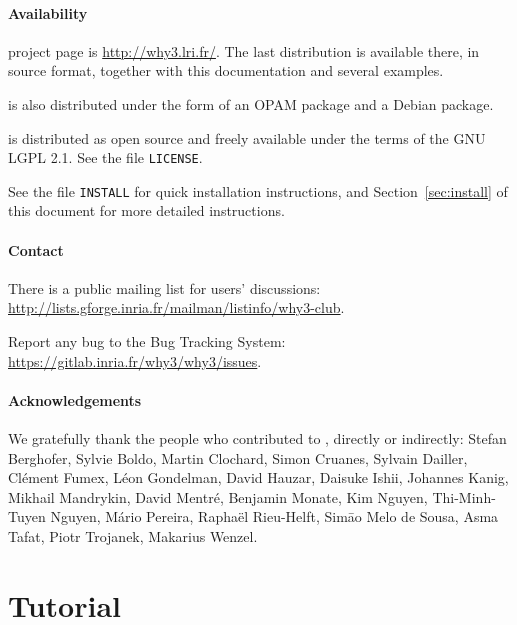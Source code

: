 \documentclass[a4paper,11pt,twoside,openright]{memoir}
\begin{document}
\subsection*{Availability}

\why project page is \url{http://why3.lri.fr/}.  The last distribution
is available there, in source format, together with this documentation
and several examples.

\why is also distributed under the form of an OPAM package and a
Debian package.

\why is distributed as open source and freely available under the
terms of the GNU LGPL 2.1. See the file \texttt{LICENSE}.

See the file \texttt{INSTALL} for quick installation instructions, and
Section~\ref{sec:install} of this document for more detailed
instructions.

\subsection*{Contact}

There is a public mailing list for users' discussions:
\url{http://lists.gforge.inria.fr/mailman/listinfo/why3-club}.

Report any bug to the \why Bug Tracking System:
\url{https://gitlab.inria.fr/why3/why3/issues}.


\subsection*{Acknowledgements}

We gratefully thank the people who contributed to \why, directly or
indirectly:
Stefan Berghofer,
Sylvie Boldo,
Martin Clochard,
Simon Cruanes,
Sylvain Dailler,
Cl\'ement Fumex,
L\'eon Gondelman,
David Hauzar,
Daisuke Ishii,
Johannes Kanig,
Mikhail Mandrykin,
David Mentr\'e,
Benjamin Monate,
Kim Nguyen,
Thi-Minh-Tuyen Nguyen,
M\'ario Pereira,
Rapha\"el Rieu-Helft,
Sim\=ao Melo de Sousa,
Asma Tafat,
Piotr Trojanek,
Makarius Wenzel.

\cleardoublepage

\tableofcontents

%

\part{Tutorial}


\end{document}
